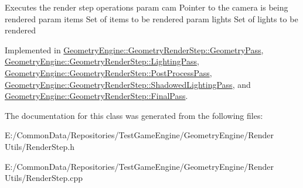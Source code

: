 Executes the render step operations param cam Pointer to the camera is being rendered param items Set of items to be rendered param lights Set of lights to be rendered 

Implemented in \mbox{\hyperlink{class_geometry_engine_1_1_geometry_render_step_1_1_geometry_pass_ac3bfd0a3915cd8a8cd7e1bf81157f6ad}{Geometry\+Engine\+::\+Geometry\+Render\+Step\+::\+Geometry\+Pass}}, \mbox{\hyperlink{class_geometry_engine_1_1_geometry_render_step_1_1_lighting_pass_ae6d9fa99f67e659839ca310947787f52}{Geometry\+Engine\+::\+Geometry\+Render\+Step\+::\+Lighting\+Pass}}, \mbox{\hyperlink{class_geometry_engine_1_1_geometry_render_step_1_1_post_process_pass_a2ebe2a0b940e47ccd10e649bff77138d}{Geometry\+Engine\+::\+Geometry\+Render\+Step\+::\+Post\+Process\+Pass}}, \mbox{\hyperlink{class_geometry_engine_1_1_geometry_render_step_1_1_shadowed_lighting_pass_af52807435083cd96125e6ef6d7453027}{Geometry\+Engine\+::\+Geometry\+Render\+Step\+::\+Shadowed\+Lighting\+Pass}}, and \mbox{\hyperlink{class_geometry_engine_1_1_geometry_render_step_1_1_final_pass_ad078d0e9d394754dbbd3cff871d72b9f}{Geometry\+Engine\+::\+Geometry\+Render\+Step\+::\+Final\+Pass}}.



The documentation for this class was generated from the following files\+:\begin{DoxyCompactItemize}
\item 
E\+:/\+Common\+Data/\+Repositories/\+Test\+Game\+Engine/\+Geometry\+Engine/\+Render Utils/Render\+Step.\+h\item 
E\+:/\+Common\+Data/\+Repositories/\+Test\+Game\+Engine/\+Geometry\+Engine/\+Render Utils/Render\+Step.\+cpp\end{DoxyCompactItemize}
